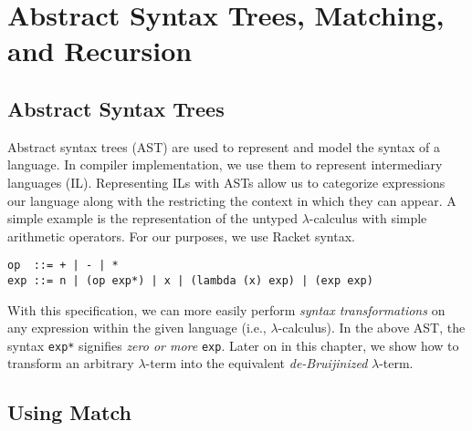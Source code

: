 \documentclass[12pt]{book}
\begin{document}

\chapter{Abstract Syntax Trees, Matching, and Recursion}
\label{ch:trees-recur}

\section{Abstract Syntax Trees}
Abstract syntax trees (AST) are used to represent and model the syntax of a
language. In compiler implementation, we use them to represent intermediary 
languages (IL). Representing ILs with ASTs allow us to categorize expressions
our language along with the restricting the context in which they can 
appear. A simple example is the representation of the untyped 
\mbox{\(\lambda\)-calculus} with simple arithmetic operators. For our 
purposes, we use Racket syntax.

\begin{verbatim}
op  ::= + | - | *
exp ::= n | (op exp*) | x | (lambda (x) exp) | (exp exp)
\end{verbatim}
With this specification, we can more easily perform \textit{syntax 
transformations} on any expression within the given language (i.e., 
\(\lambda\)-calculus). In the above AST, the syntax {\tt exp*} signifies
\textit{zero or more} {\tt exp}. Later on in this chapter,  we show how 
to transform an arbitrary \(\lambda\)-term into the equivalent 
\textit{de-Bruijinized} \(\lambda\)-term.

\section{Using Match}
\end{document}
